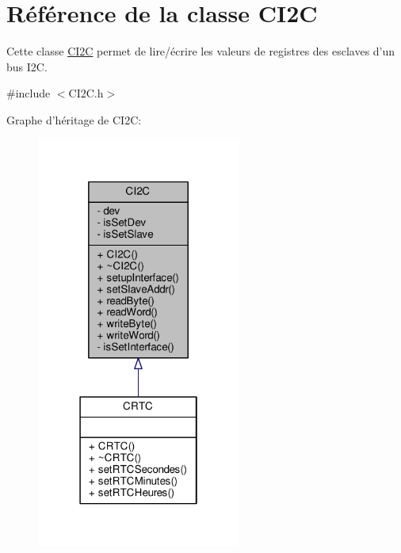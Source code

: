 \hypertarget{classCI2C}{\section{Référence de la classe C\+I2\+C}
\label{classCI2C}
}


Cette classe \hyperlink{classCI2C}{C\+I2\+C} permet de lire/écrire les valeurs de registres des esclaves d'un bus I2\+C.  




{\ttfamily \#include $<$C\+I2\+C.\+h$>$}



Graphe d'héritage de C\+I2\+C\+:
\nopagebreak
\begin{figure}[H]
\begin{center}
\leavevmode
\includegraphics[width=190pt]{classCI2C__inherit__graph}
\end{center}
\end{figure}


